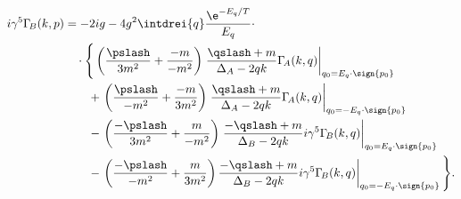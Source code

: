 \begin{equation}
\begin{split}
  i\gamma^5\Gamma_{\!B}(k,p)&=
  -2ig-4g^2\intdrei{q}\frac{\e^{-E_q/T}}{E_q}\cdot\\
  &\quad\cdot\Bigg\{ \left(\frac{\pslash}{3m^2}+\frac{-m}{-m^2}\right)
  \left.\frac{\qslash+m}{\Delta_A-2qk}
    \Gamma_{\!A}(k,q)\right|_{q_0=E_q\cdot\sign{p_0}} \\
  &\qquad+\left. \left(\frac{\pslash}{-m^2}+\frac{-m}{3m^2}\right)
    \left.\frac{\qslash+m}{\Delta_A-2qk}
      \Gamma_{\!A}(k,q)\right|_{q_0=-E_q\cdot\sign{p_0}} \right.\\
  &\qquad-\left. \left(\frac{-\pslash}{3m^2}+\frac{m}{-m^2}\right)
    \left.\frac{-\qslash+m}{\Delta_B-2qk}
    i\gamma^5\Gamma_{\!B}(k,q)\right|_{q_0=E_q\cdot\sign{p_0}}\right.\\
  &\qquad-\left. \left(\frac{-\pslash}{-m^2}+\frac{m}{3m^2}\right)
    \frac{-\qslash+m}{\Delta_B-2qk}
    i\gamma^5\Gamma_{\!B}(k,q)\right|_{q_0=-E_q\cdot\sign{p_0}}
  \Bigg\}.
\end{split}
\end{equation}

